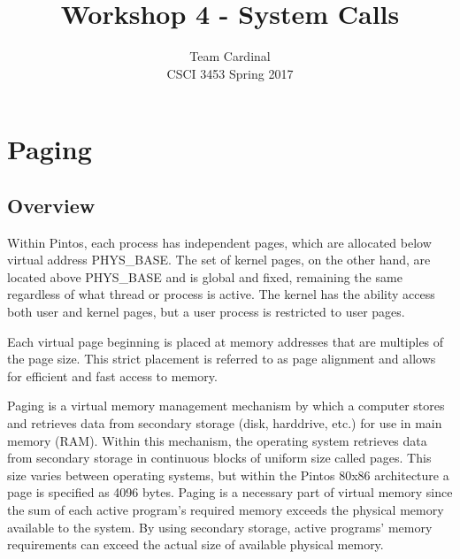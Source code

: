 \documentclass[11pt, letterpaper]{article}
\begin{document}

\title{Workshop 4 - System Calls}
\author{Team Cardinal\\CSCI 3453 Spring 2017}
\maketitle




\section{Paging}

\subsection{Overview}
Within Pintos, each process has independent pages, which are allocated below virtual address PHYS\_BASE. The set of kernel pages, on the other hand, are located above PHYS\_BASE and is global and fixed, remaining the  same regardless of what thread or process is active. The kernel has the ability access both user and   kernel pages, but a user process is restricted to user pages.
   
Each virtual page beginning is placed at memory addresses  that are multiples of the page size. This strict placement is referred to as  page alignment and allows for efficient and fast access to memory. 

Paging is a virtual memory management mechanism by which a computer stores and retrieves data from secondary storage (disk, harddrive, etc.) for use in main memory (RAM).  Within this mechanism,  the operating system retrieves data from secondary storage in continuous blocks of uniform size called pages. This size varies between operating systems, but within the Pintos 80x86 architecture a page is specified as 4096 bytes.   Paging is a necessary part of virtual memory  since the sum of each active program’s required memory exceeds the physical memory available to the system. By using secondary storage, active programs’ memory requirements can exceed the actual size of available physical memory.
\end{document}
